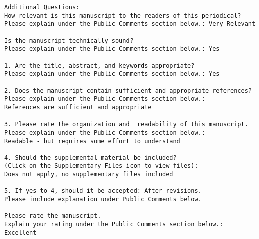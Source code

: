 \documentclass[times,10pt,twocolumn]{article}
\begin{document}
\begin{verbatim} 
Additional Questions:
How relevant is this manuscript to the readers of this periodical? 
Please explain under the Public Comments section below.: Very Relevant

Is the manuscript technically sound? 
Please explain under the Public Comments section below.: Yes

1. Are the title, abstract, and keywords appropriate? 
Please explain under the Public Comments section below.: Yes

2. Does the manuscript contain sufficient and appropriate references? 
Please explain under the Public Comments section below.: 
References are sufficient and appropriate

3. Please rate the organization and  readability of this manuscript. 
Please explain under the Public Comments section below.: 
Readable - but requires some effort to understand

4. Should the supplemental material be included? 
(Click on the Supplementary Files icon to view files): 
Does not apply, no supplementary files included

5. If yes to 4, should it be accepted: After revisions.  
Please include explanation under Public Comments below.

Please rate the manuscript. 
Explain your rating under the Public Comments section below.: Excellent

\end{verbatim}


\endgroup 

\newpage
\end{document}
